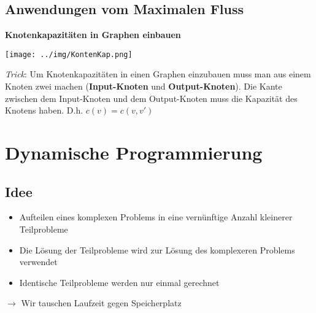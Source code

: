 \documentclass[german]{latex4ei/latex4ei_sheet}
\begin{document}
\begin{sectionbox}
\subsection{Anwendungen vom Maximalen Fluss}\medskip

\textbf{Knotenkapazitäten in Graphen einbauen}\par
\texttt{[image: ../img/KontenKap.png]}\par
\textit{Trick}: Um Knotenkapazitäten in einen Graphen einzubauen muss man aus einem Knoten zwei machen (\textbf{Input-Knoten} und \textbf{Output-Knoten}). Die Kante zwischen dem Input-Knoten und dem Output-Knoten muss die Kapazität des Knotens haben. D.h. $c(v) = c(v,v')$\par\smallskip
\end{sectionbox}

\newpage
\section{Dynamische Programmierung}

\begin{sectionbox}
\subsection{Idee}\smallskip
\begin{itemize}
    \item Aufteilen eines komplexen Problems in eine vernünftige Anzahl kleinerer Teilprobleme
    \item Die Lösung der Teilprobleme wird zur Lösung des komplexeren Problems verwendet
    \item Identische Teilprobleme werden nur einmal gerechnet
\end{itemize}\smallskip
$\rightarrow$ Wir tauschen Laufzeit gegen Speicherplatz
\end{sectionbox}
\end{document}
